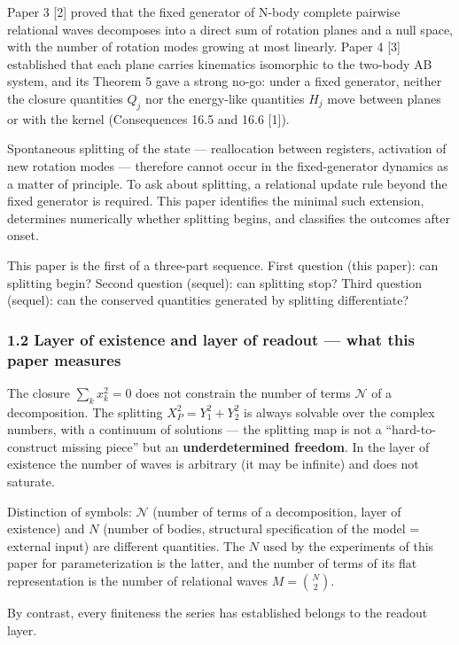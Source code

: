\documentclass[
  a4paper,
]{article}
\begin{document}
Paper 3 {[}2{]} proved that the fixed generator of N-body complete
pairwise relational waves decomposes into a direct sum of rotation
planes and a null space, with the number of rotation modes growing at
most linearly. Paper 4 {[}3{]} established that each plane carries
kinematics isomorphic to the two-body AB system, and its Theorem 5 gave
a strong no-go: under a fixed generator, neither the closure quantities
\(Q_j\) nor the energy-like quantities \(H_j\) move between planes or
with the kernel (Consequences 16.5 and 16.6 {[}1{]}).

Spontaneous splitting of the state --- reallocation between registers,
activation of new rotation modes --- therefore cannot occur in the
fixed-generator dynamics as a matter of principle. To ask about
splitting, a relational update rule beyond the fixed generator is
required. This paper identifies the minimal such extension, determines
numerically whether splitting begins, and classifies the outcomes after
onset.

This paper is the first of a three-part sequence. First question (this
paper): can splitting begin? Second question (sequel): can splitting
stop? Third question (sequel): can the conserved quantities generated by
splitting differentiate?

\subsubsection{1.2 Layer of existence and layer of readout --- what this
paper
measures}\label{layer-of-existence-and-layer-of-readout-what-this-paper-measures}

The closure \(\sum_k x_k^2=0\) does not constrain the number of terms
\(\mathcal N\) of a decomposition. The splitting \(X_P^2=Y_1^2+Y_2^2\)
is always solvable over the complex numbers, with a continuum of
solutions --- the splitting map is not a ``hard-to-construct missing
piece'' but an \textbf{underdetermined freedom}. In the layer of
existence the number of waves is arbitrary (it may be infinite) and does
not saturate.

Distinction of symbols: \(\mathcal N\) (number of terms of a
decomposition, layer of existence) and \(N\) (number of bodies,
structural specification of the model = external input) are different
quantities. The \(N\) used by the experiments of this paper for
parameterization is the latter, and the number of terms of its flat
representation is the number of relational waves \(M=\binom N2\).

By contrast, every finiteness the series has established belongs to the
readout layer.
\end{document}
